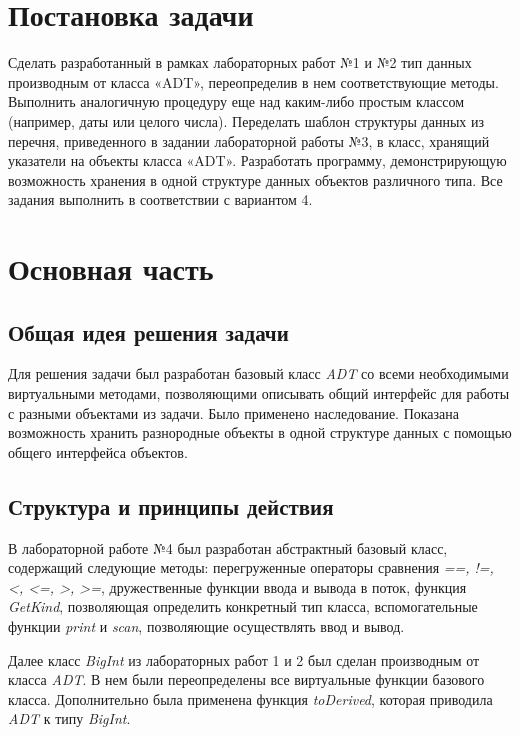 \documentclass[a4paper,14pt]{article}
\begin{document}

\setcounter{page}{2} %

\renewcommand\contentsname{\centering {\normalsize Содержание}}
\tableofcontents
\newpage

\section*{Постановка задачи}

Сделать разработанный в рамках лабораторных работ №1 и №2 тип данных производным от класса «ADT», переопределив в нем соответствующие методы. Выполнить аналогичную процедуру еще над
каким-либо простым классом (например, даты или целого числа). Переделать шаблон структуры данных из перечня, приведенного в задании лабораторной работы №3, в класс, хранящий указатели на
объекты класса «ADT». Разработать программу, демонстрирующую возможность хранения в одной структуре данных объектов различного типа. Все задания выполнить в соответствии с вариантом 4.

\newpage

\section{Основная часть}
\subsection{Общая идея решения задачи}
Для решения задачи был разработан базовый класс \textit{ADT} со всеми необходимыми виртуальными методами, позволяющими описывать общий интерфейс для работы с разными объектами из задачи. Было применено наследование. Показана возможность хранить разнородные объекты в одной структуре данных с помощью общего интерфейса объектов. 
\subsection{Структура и принципы действия}
В лабораторной работе №4 был разработан абстрактный базовый класс, содержащий следующие методы: перегруженные операторы сравнения \textit{==, !=, <, <=, >, >=}, дружественные функции ввода и вывода в поток, функция \textit{GetKind}, позволяющая определить конкретный тип класса, вспомогательные функции \textit{print} и \textit{scan}, позволяющие осуществлять ввод и вывод.

Далее класс \textit{BigInt} из лабораторных работ 1 и 2 был сделан производным от класса \textit{ADT}. В нем были переопределены все виртуальные функции базового класса. Дополнительно была применена функция \textit{toDerived}, которая приводила \textit{ADT} к типу \textit{BigInt}.
\end{document}
